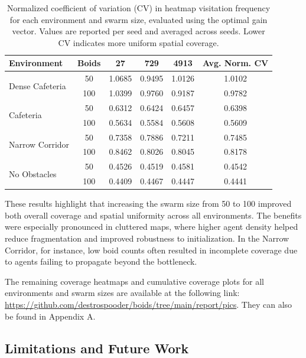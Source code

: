 \documentclass[12pt]{article}
\begin{document}
\begin{table}[H]
    \footnotesize
    \centering
    \begin{tabular}{|l|c|c|c|c|c|}
    \hline
    \textbf{Environment} & \textbf{Boids} & \textbf{27} & \textbf{729} & \textbf{4913} & \textbf{Avg. Norm. CV} \\
    \hline
    \multirow{2}{*}{Dense Cafeteria}    
        & 50  & 1.0685 & 0.9495 & 1.0126 & 1.0102 \\
        & 100 & 1.0399 & 0.9760 & 0.9187 & 0.9782 \\
    \hline
    \multirow{2}{*}{Cafeteria}          
        & 50  & 0.6312 & 0.6424 & 0.6457 & 0.6398 \\
        & 100 & 0.5634 & 0.5584 & 0.5608 & 0.5609 \\
    \hline
    \multirow{2}{*}{Narrow Corridor}    
        & 50  & 0.7358 & 0.7886 & 0.7211 & 0.7485 \\
        & 100 & 0.8462 & 0.8026 & 0.8045 & 0.8178 \\
    \hline
    \multirow{2}{*}{No Obstacles}       
        & 50  & 0.4526 & 0.4519 & 0.4581 & 0.4542 \\
        & 100 & 0.4409 & 0.4467 & 0.4447 & 0.4441 \\
    \hline
    \end{tabular}
    \caption{Normalized coefficient of variation (CV) in heatmap visitation frequency for each environment and swarm size, evaluated using the optimal gain vector. Values are reported per seed and averaged across seeds. Lower CV indicates more uniform spatial coverage.}
    \label{tab:normalized_cv}
\end{table}

These results highlight that increasing the swarm size from 50 to 100 improved both overall coverage and spatial uniformity across all environments. The benefits were especially pronounced in cluttered maps, where higher agent density helped reduce fragmentation and improved robustness to initialization. In the Narrow Corridor, for instance, low boid counts often resulted in incomplete coverage due to agents failing to propagate beyond the bottleneck.

The remaining coverage heatmaps and cumulative coverage plots for all environments and swarm sizes are available at the following link:
\url{https://github.com/destrospooder/boids/tree/main/report/pics}. They can also be found in Appendix A.

\subsection{Limitations and Future Work}
\end{document}
